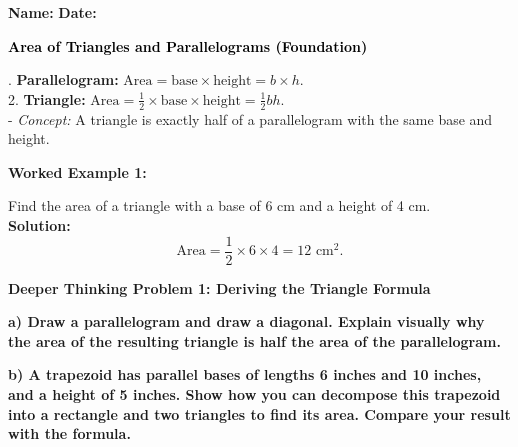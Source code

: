 \documentclass[12pt, letterpaper, fleqn]{article}
\begin{document}
\textbf{Name:} \underline{\hspace{5cm}}
\hfill
\textbf{Date:} \underline{\hspace{3cm}}\\

\begin{tcolorbox}[colback=black!10]
    \large\textcolor{black}{\textbf{Area of Triangles and Parallelograms (Foundation)}}
\end{tcolorbox}

\vspace{3mm}

. \textbf{Parallelogram:} $\text{Area} = \text{base} \times \text{height} = b \times h$. \\
2. \textbf{Triangle:} $\text{Area} = \frac{1}{2} \times \text{base} \times \text{height} = \frac{1}{2}bh$. \\
- \textit{Concept:} A triangle is exactly half of a parallelogram with the same base and height.

\vspace{4mm}

\begin{tcolorbox}[colback=white, colframe=black!25, boxrule=0.6pt, arc=4mm, left=6mm, right=6mm, top=5mm, bottom=5mm]
\textbf{Worked Example 1:}

\medskip
\noindent
Find the area of a triangle with a base of 6 cm and a height of 4 cm.\\
\textbf{Solution:} \\
$$\text{Area} = \frac{1}{2} \times 6 \times 4 = 12\text{ cm}^2.$$
\end{tcolorbox}

\vspace{4mm}

\begin{tcolorbox}[colback=black!5, colframe=black!50, boxrule=1pt, arc=4mm, left=6mm, right=6mm, top=5mm, bottom=5mm]
\textbf{Deeper Thinking Problem 1: Deriving the Triangle Formula}

\medskip

\noindent
\textbf{a) Draw a parallelogram and draw a diagonal. Explain visually why the area of the resulting triangle is half the area of the parallelogram.}

\vspace{2.5cm}

\noindent
\textbf{b) A trapezoid has parallel bases of lengths 6 inches and 10 inches, and a height of 5 inches. Show how you can decompose this trapezoid into a rectangle and two triangles to find its area. Compare your result with the formula.}

\vspace{2cm}
\end{tcolorbox}
\newpage
\end{document}
